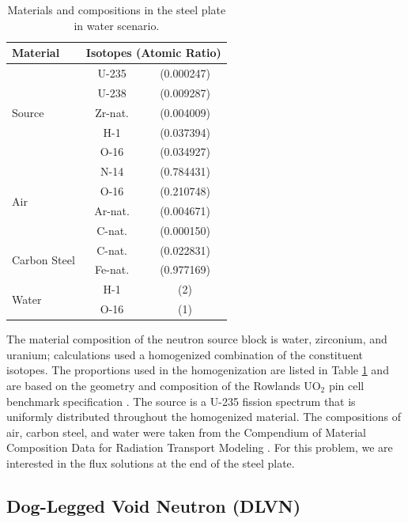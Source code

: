 \documentclass{article} %
\begin{document}
\begin{table}[!htb]
\centering
\caption{Materials and compositions in the steel plate in water scenario.}
\label{steel-mat}
\begin{tabular}{l|cc}
\textbf{Material} & \multicolumn{2}{c}{\textbf{Isotopes (Atomic Ratio)}} \\ \hline
\multirow{5}{*}{Source}   & U-235   & (0.000247) \\
                          & U-238   & (0.009287) \\
                          & Zr-nat. & (0.004009) \\
                          & H-1     & (0.037394) \\
                          & O-16    & (0.034927) \\ \hline
\multirow{4}{*}{Air}      & N-14    & (0.784431) \\
                          & O-16    & (0.210748) \\
                          & Ar-nat. & (0.004671) \\
                          & C-nat.  & (0.000150) \\ \hline
\multirow{2}{*}{Carbon Steel} & C-nat.  & (0.022831) \\
                              & Fe-nat. & (0.977169) \\ \hline
\multirow{2}{*}{Water}        & H-1     & (2)        \\
                              & O-16    & (1)        \\
\end{tabular}
\end{table}

The material composition of the neutron source block is water, zirconium, and
uranium; calculations used a homogenized combination of the constituent
isotopes. The proportions used in the homogenization are listed in Table
\ref{steel-mat} and are based on the geometry and composition of the Rowlands
UO$_2$ pin cell benchmark specification \cite{pincell}. The source is a U-235
fission spectrum that is uniformly distributed throughout the homogenized
material. The compositions of air, carbon steel, and water were taken from the
Compendium of Material Composition Data for Radiation Transport Modeling
\cite{pnnl}. For this problem, we are interested in the flux solutions at the
end of the steel plate.

\subsection{Dog-Legged Void Neutron (DLVN)}
\end{document}
